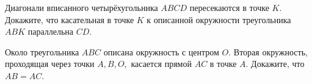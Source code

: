
Диагонали вписанного четырёхугольника $ABCD$ пересекаются в точке $K$. Докажите, что касательная в точке $K$ к описанной окружности треугольника $ABK$ параллельна $CD$.

Около треугольника $ABC$ описана окружность с центром $O$. Вторая окружность, проходящая через точки $A, B, O,$ касается прямой $AC$ в точке $A$. Докажите, что $AB = AC.$



